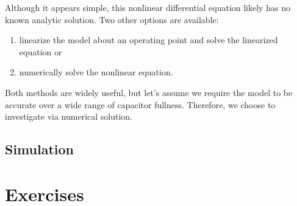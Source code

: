 \documentclass[dynamic_systems.tex]{subfiles}
\begin{document}
Although it appears simple, this nonlinear differential equation likely has no known analytic solution.
Two other options are available:
\tags{}
\begin{enumerate}
  \item linearize the model about an operating point and solve the linearized equation or
  \item numerically solve the nonlinear equation.
\end{enumerate}

Both methods are widely useful, but let's assume we require the model to be accurate over a wide range of capacitor fullness.
Therefore, we choose to investigate via numerical solution.

\subsection{Simulation}



\section*{Exercises}








\end{document}
